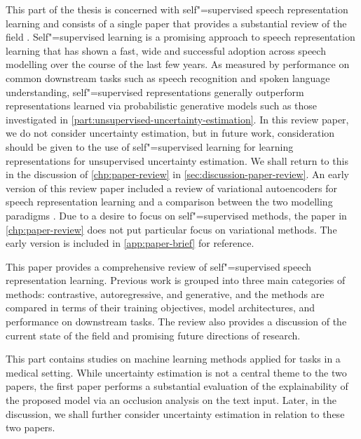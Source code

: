 This part of the thesis is concerned with self"=supervised speech representation learning and consists of a single paper that provides a substantial review of the field \parencite{mohamed_selfsupervised_2022}. 
Self"=supervised learning is a promising approach to speech representation learning that has shown a fast, wide and successful adoption across speech modelling over the course of the last few years. 
As measured by performance on common downstream tasks such as speech recognition and spoken language understanding, self"=supervised representations generally outperform representations learned via probabilistic generative models such as those investigated in \cref{part:unsupervised-uncertainty-estimation}. 
In this review paper, we do not consider uncertainty estimation, but in future work, consideration should be given to the use of self"=supervised learning for learning representations for unsupervised uncertainty estimation. 
We shall return to this in the discussion of \cref{chp:paper-review} in \cref{sec:discussion-paper-review}.
An early version of this review paper included a review of variational autoencoders for speech representation learning and a comparison between the two modelling paradigms \parencite{borgholt_brief_2022}. 
Due to a desire to focus on self"=supervised methods, the paper in \cref{chp:paper-review} does not put particular focus on variational methods. 
The early version is included in \cref{app:paper-brief} for reference.

This paper provides a comprehensive review of self"=supervised speech representation learning. Previous work is grouped into three main categories of methods: contrastive, autoregressive, and generative, and the methods are compared in terms of their training objectives, model architectures, and performance on downstream tasks. The review also provides a discussion of the current state of the field and promising future directions of research. 

 
This part contains studies on machine learning methods applied for tasks in a medical setting. While uncertainty estimation is not a central theme to the two papers, the first paper performs a substantial evaluation of the explainability of the proposed model via an occlusion analysis on the text input. Later, in the discussion, we shall further consider uncertainty estimation in relation to these two papers.

